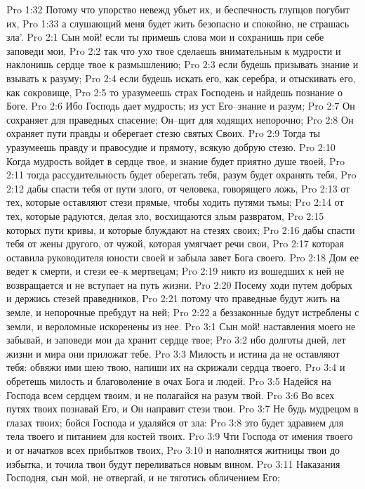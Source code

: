 Pro 1:32  Потому что упорство невежд убьет их, и беспечность глупцов погубит их,
Pro 1:33  а слушающий меня будет жить безопасно и спокойно, не страшась зла'.
Pro 2:1  Сын мой! если ты примешь слова мои и сохранишь при себе заповеди мои,
Pro 2:2  так что ухо твое сделаешь внимательным к мудрости и наклонишь сердце твое к размышлению;
Pro 2:3  если будешь призывать знание и взывать к разуму;
Pro 2:4  если будешь искать его, как серебра, и отыскивать его, как сокровище,
Pro 2:5  то уразумеешь страх Господень и найдешь познание о Боге.
Pro 2:6  Ибо Господь дает мудрость; из уст Его--знание и разум;
Pro 2:7  Он сохраняет для праведных спасение; Он--щит для ходящих непорочно;
Pro 2:8  Он охраняет пути правды и оберегает стезю святых Своих.
Pro 2:9  Тогда ты уразумеешь правду и правосудие и прямоту, всякую добрую стезю.
Pro 2:10  Когда мудрость войдет в сердце твое, и знание будет приятно душе твоей,
Pro 2:11  тогда рассудительность будет оберегать тебя, разум будет охранять тебя,
Pro 2:12  дабы спасти тебя от пути злого, от человека, говорящего ложь,
Pro 2:13  от тех, которые оставляют стези прямые, чтобы ходить путями тьмы;
Pro 2:14  от тех, которые радуются, делая зло, восхищаются злым развратом,
Pro 2:15  которых пути кривы, и которые блуждают на стезях своих;
Pro 2:16  дабы спасти тебя от жены другого, от чужой, которая умягчает речи свои,
Pro 2:17  которая оставила руководителя юности своей и забыла завет Бога своего.
Pro 2:18  Дом ее ведет к смерти, и стези ее--к мертвецам;
Pro 2:19  никто из вошедших к ней не возвращается и не вступает на путь жизни.
Pro 2:20  Посему ходи путем добрых и держись стезей праведников,
Pro 2:21  потому что праведные будут жить на земле, и непорочные пребудут на ней;
Pro 2:22  а беззаконные будут истреблены с земли, и вероломные искоренены из нее.
Pro 3:1  Сын мой! наставления моего не забывай, и заповеди мои да хранит сердце твое;
Pro 3:2  ибо долготы дней, лет жизни и мира они приложат тебе.
Pro 3:3  Милость и истина да не оставляют тебя: обвяжи ими шею твою, напиши их на скрижали сердца твоего,
Pro 3:4  и обретешь милость и благоволение в очах Бога и людей.
Pro 3:5  Надейся на Господа всем сердцем твоим, и не полагайся на разум твой.
Pro 3:6  Во всех путях твоих познавай Его, и Он направит стези твои.
Pro 3:7  Не будь мудрецом в глазах твоих; бойся Господа и удаляйся от зла:
Pro 3:8  это будет здравием для тела твоего и питанием для костей твоих.
Pro 3:9  Чти Господа от имения твоего и от начатков всех прибытков твоих,
Pro 3:10  и наполнятся житницы твои до избытка, и точила твои будут переливаться новым вином.
Pro 3:11  Наказания Господня, сын мой, не отвергай, и не тяготись обличением Его;
